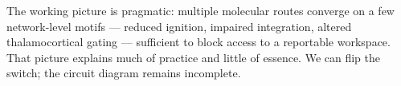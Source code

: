 The working picture is pragmatic: multiple molecular routes converge on a few network-level motifs — reduced ignition, impaired integration, altered thalamocortical gating — sufficient to block access to a reportable workspace. That picture explains much of practice and little of essence. We can flip the switch; the circuit diagram remains incomplete.

